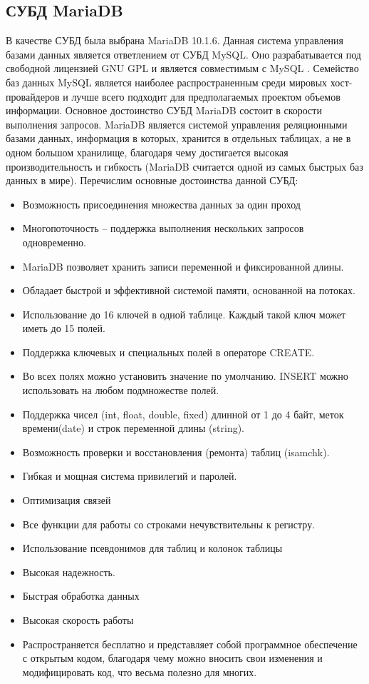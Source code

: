 \documentclass[a4paper,14pt]{extreport}
\theoremstyle{definition}
\begin{document}
\subsection{СУБД MariaDB}
В качестве СУБД была выбрана MariaDB 10.1.6. Данная система управления базами данных является ответлением от СУБД MySQL\cite{Dyer}. Оно разрабатывается под свободной лицензией GNU GPL и является совместимым с MySQL . Семейство баз данных MySQL является наиболее распространенным среди мировых хост-провайдеров и лучше всего подходит для предполагаемых проектом объемов информации.
Основное достоинство СУБД MariaDB состоит в скорости выполнения запросов. MariaDB является системой управления реляционными базами данных, информация в которых, хранится в отдельных таблицах, а не в одном большом хранилище, благодаря чему достигается высокая производительность и гибкость (MariaDB считается одной из самых быстрых баз данных в мире).
Перечислим основные достоинства данной СУБД\cite{Dyer}:
\begin{itemize}
\item Возможность присоединения множества данных за один проход
\item Многопоточность – поддержка выполнения нескольких запросов одновременно.
\item MariaDB позволяет хранить записи переменной и фиксированной длины.
\item Обладает быстрой и эффективной системой памяти, основанной на потоках.
\item Использование до 16 ключей в одной таблице. Каждый такой ключ может иметь до 15 полей.
\item Поддержка ключевых и специальных полей в операторе CREATE.
\item Во всех полях можно установить значение по умолчанию. INSERT можно использовать на любом подмножестве полей.
\item Поддержка чисел (int, float, double, fixed) длинной от 1 до 4 байт, меток времени(date) и строк переменной длины (string).
\item Возможность проверки и восстановления (ремонта) таблиц (isamchk).
\item Гибкая и мощная система привилегий и паролей.
\item Оптимизация связей
\item Все функции для работы со строками нечувствительны к регистру.
\item Использование псевдонимов для таблиц и колонок таблицы
\item Высокая надежность.
\item Быстрая обработка данных
\item Высокая скорость работы
\item Распространяется бесплатно и представляет собой программное обеспечение с открытым кодом, благодаря чему можно вносить свои изменения и модифицировать код, что весьма полезно для многих.
\end{itemize}
\end{document}

